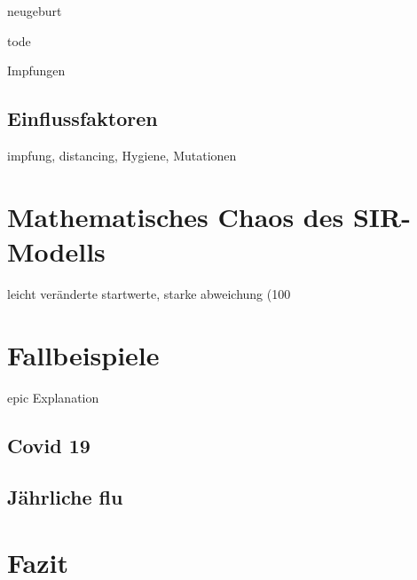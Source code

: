 \documentclass[12pt]{scrartcl} %
\begin{document}
\textnu neugeburt

\textmu tode

\textrho Impfungen


\newpage
\subsection{Einflussfaktoren}

impfung, distancing, Hygiene, Mutationen


\section{Mathematisches Chaos des SIR-Modells}

leicht veränderte startwerte, starke abweichung (100%


\newpage
\section{Fallbeispiele}

epic Explanation


\subsection{Covid 19}

\newpage
\subsection{Jährliche flu}

\newpage
\section{Fazit}


\newpage
\setlength{\bibitemsep}{\baselineskip}
\printbibliography[heading=bibintoc]
\thispagestyle{empty}
\listoffigures
\end{document}
